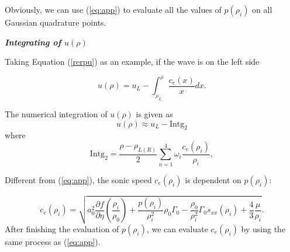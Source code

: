 \documentclass[review]{elsarticle}
\numberwithin{equation}{section}
\numberwithin{table}{section}
\begin{document}
\begin{appendices}
Obviously, we can use (\ref{eq:app}) to evaluate all the values of $p(\rho_{i})$ on all Gaussian quadrature points.


\emph{\textbf{Integrating of $u(\rho)$}}

Taking Equation (\ref{rerpu}) as an example, if the wave is on the left side

$$u(\rho) = u_L - \int_{\rho_L}^{\rho} \frac{c_e(x)}{x} dx. $$

The numerical integration of $u(\rho)$ is given as
\begin{equation}
  u(\rho) \approx u_L - \text{Intg}_2
\end{equation}
where
$$\text{Intg}_2  =  \frac{\rho - \rho_{L(R)}}{2} \sum_{n=1}^4 \omega_i \frac{c_e(\rho_i)}{\rho_i}, $$

Different from (\ref{eq:app}), the sonic speed $c_e(\rho_i)$ is dependent on $p(\rho_i)$:

\begin{equation}
  c_e(\rho_i) =
  \sqrt{a_0^2 \frac{\partial f}{\partial \eta}\left(\frac{\rho_i}{\rho_0}\right) + \frac{p(\rho_i)}{\rho_i^2}\rho_0\Gamma_0 -\frac{\rho_0}{\rho_i^2}\Gamma_0 s_{xx}(\rho_i) +\frac{4}{3}\frac{\mu}{\rho_i}}. %
\end{equation}
After finishing the evaluation of  $p(\rho_{i})$, we can evaluate $c_e(\rho_i)$ by using the same process as (\ref{eq:app}).


\end{appendices}
\end{document}
